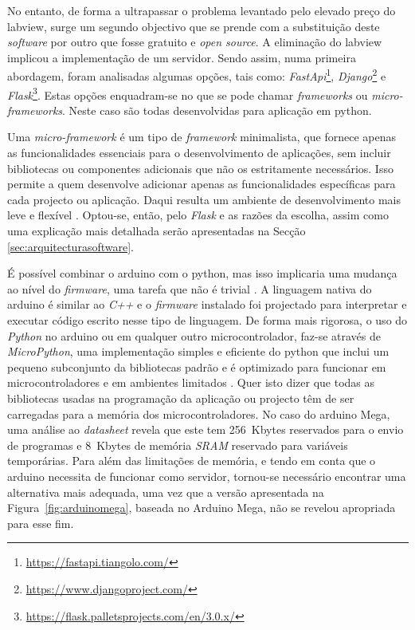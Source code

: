 No entanto, de forma a ultrapassar o problema levantado pelo elevado preço do \acrshort{labview}, surge um segundo objectivo que se prende com a substituição deste \textit{software} por outro que fosse gratuito e \textit{open source}. A eliminação do \acrshort{labview} implicou a implementação de um servidor. Sendo assim, numa primeira abordagem, foram analisadas algumas opções, tais como: \textit{FastApi}\footnote{\url{https://fastapi.tiangolo.com/}}, \textit{Django}\footnote{\url{https://www.djangoproject.com/}} e \textit{Flask}\footnote{\url{https://flask.palletsprojects.com/en/3.0.x/}}. Estas opções enquadram-se no que se pode chamar \textit{frameworks} ou \textit{micro-frameworks}. Neste caso são todas desenvolvidas para aplicação em \gls{python}.

Uma \textit{micro-framework} é um tipo de \textit{framework} minimalista, que fornece apenas as funcionalidades essenciais para o desenvolvimento de aplicações, sem incluir bibliotecas ou componentes adicionais que não os estritamente necessários. Isso permite a quem desenvolve adicionar apenas as funcionalidades específicas para cada projecto ou aplicação. Daqui resulta um ambiente de desenvolvimento mais leve e flexível \cite{Flask}.
Optou-se, então, pelo \textit{Flask} e as razões da escolha, assim como uma explicação mais detalhada serão apresentadas na Secção \ref{sec:arquitecturasoftware}.

É possível combinar o \gls{arduino} com o \gls{python}, mas isso implicaria uma mudança ao nível do \textit{firmware}, uma tarefa que não é trivial \cite{Arduinopython}. A linguagem nativa do \gls{arduino} é similar ao \textit{C++} e o \textit{firmware} instalado foi projectado para interpretar e executar código escrito nesse tipo de linguagem. De forma mais rigorosa, o uso do \textit{Python} no \gls{arduino} ou em qualquer outro microcontrolador, faz-se através de \textit{MicroPython}, uma implementação simples e eficiente do \gls{python} que inclui um pequeno subconjunto da bibliotecas padrão e é optimizado para funcionar em microcontroladores e em ambientes limitados \cite{MicroPythondefinition}. Quer isto dizer que todas as bibliotecas usadas na programação da aplicação ou projecto têm de ser carregadas para a memória dos microcontroladores. No caso do \gls{arduino} Mega, uma análise ao \textit{datasheet} \cite{megadatasheet} revela que este tem \SI{256}{Kbytes} reservados para o envio de programas e \SI{8}{Kbytes} de memória \textit{SRAM} reservado para variáveis temporárias.
Para além das limitações de memória, e tendo em conta que o \gls{arduino} necessita de funcionar como servidor, tornou-se necessário encontrar uma alternativa mais adequada, uma vez que a versão apresentada na Figura~\ref{fig:arduinomega}, baseada no Arduino Mega, não se revelou apropriada para esse fim.

